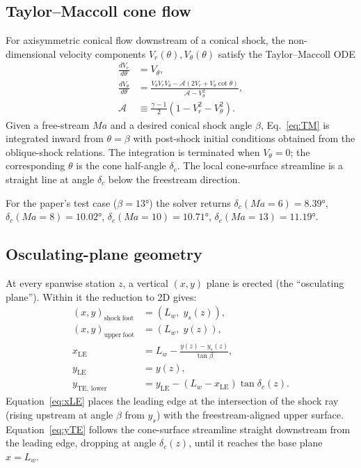 \documentclass[11pt,a4paper]{article}
\newcommand{\Ma}{\mathit{Ma}}
\newcommand{\Lw}{L_{w}}
\newcommand{\dc}{\delta_{c}}
\begin{document}
\subsection{Taylor--Maccoll cone flow}

For axisymmetric conical flow downstream of a conical shock,
the non-dimensional velocity components
$V_{r}(\theta), V_{\theta}(\theta)$ satisfy the Taylor--Maccoll ODE
\begin{equation}
\begin{aligned}
 \frac{dV_{r}}{d\theta} &= V_{\theta}, \\
 \frac{dV_{\theta}}{d\theta} &=
   \frac{V_{\theta} V_{r} V_{\theta}
         - \mathcal{A}\!\left(2 V_{r} + V_{\theta}\cot\theta\right)}
        {\mathcal{A} - V_{\theta}^{2}},\\
 \mathcal{A} &\equiv \tfrac{\gamma-1}{2}(1 - V_{r}^{2} - V_{\theta}^{2}) .
\end{aligned}
\label{eq:TM}
\end{equation}
Given a free-stream $\Ma$ and a desired conical shock angle $\beta$,
Eq.~\eqref{eq:TM} is integrated inward from $\theta=\beta$ with
post-shock initial conditions obtained from the oblique-shock relations.
The integration is terminated when $V_{\theta}=0$; the corresponding
$\theta$ is the cone half-angle $\dc$. The local cone-surface streamline
is a straight line at angle $\dc$ below the freestream direction.

For the paper's test case ($\beta=\ang{13}$) the solver returns
$\dc(\Ma{=}6)=\ang{8.39}$, $\dc(\Ma{=}8)=\ang{10.02}$,
$\dc(\Ma{=}10)=\ang{10.71}$, $\dc(\Ma{=}13)=\ang{11.19}$.

\subsection{Osculating-plane geometry}

At every spanwise station $z$, a vertical $(x,y)$ plane is erected
(the ``osculating plane''). Within it the reduction to 2D gives:
\begin{align}
 (x,y)_{\mathrm{shock\ foot}} &= (\Lw,\; y_{s}(z)), \\
 (x,y)_{\mathrm{upper\ foot}} &= (\Lw,\; y(z)), \\
 x_{\mathrm{LE}} &= \Lw - \frac{y(z) - y_{s}(z)}{\tan\beta}, \label{eq:xLE}\\
 y_{\mathrm{LE}} &= y(z), \label{eq:yLE}\\
 y_{\mathrm{TE,\,lower}} &= y_{\mathrm{LE}} - (\Lw - x_{\mathrm{LE}})\tan\dc(z). \label{eq:yTE}
\end{align}
Equation~\eqref{eq:xLE} places the leading edge at the intersection of
the shock ray (rising upstream at angle $\beta$ from $y_{s}$) with the
freestream-aligned upper surface.
Equation~\eqref{eq:yTE} follows the cone-surface streamline straight
downstream from the leading edge, dropping at angle $\dc(z)$, until it
reaches the base plane $x=\Lw$.
\end{document}
